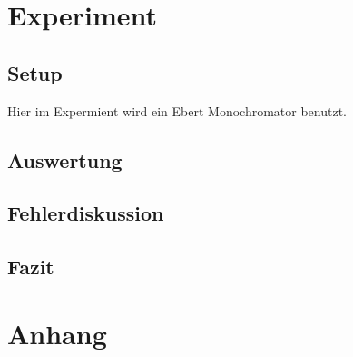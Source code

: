 \documentclass[]{article}
\begin{document}
\newpage
\section{Experiment}
\subsection{Setup}
Hier im Expermient wird ein Ebert Monochromator benutzt. 


\subsection{Auswertung}
\subsection{Fehlerdiskussion}

\subsection{Fazit}

\section{Anhang}


\newpage
\begin{thebibliography}{}


\end{thebibliography}
\end{document}
